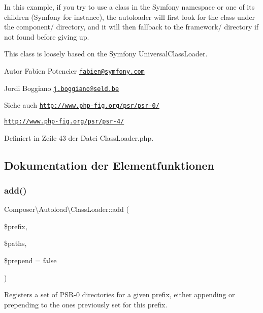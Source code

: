 In this example, if you try to use a class in the Symfony namespace or one of its children (Symfony for instance), the autoloader will first look for the class under the component/ directory, and it will then fallback to the framework/ directory if not found before giving up.

This class is loosely based on the Symfony Universal\+Class\+Loader.

\begin{DoxyAuthor}{Autor}
Fabien Potencier \href{mailto:fabien@symfony.com}{\tt fabien@symfony.\+com} 

Jordi Boggiano \href{mailto:j.boggiano@seld.be}{\tt j.\+boggiano@seld.\+be} 
\end{DoxyAuthor}
\begin{DoxySeeAlso}{Siehe auch}
\href{http://www.php-fig.org/psr/psr-0/}{\tt http\+://www.\+php-\/fig.\+org/psr/psr-\/0/} 

\href{http://www.php-fig.org/psr/psr-4/}{\tt http\+://www.\+php-\/fig.\+org/psr/psr-\/4/} 
\end{DoxySeeAlso}


Definiert in Zeile 43 der Datei Class\+Loader.\+php.



\subsection{Dokumentation der Elementfunktionen}
\mbox{\label{class_composer_1_1_autoload_1_1_class_loader_aa99f46d61bdf20b924a1bb08bfcb90bd}} 
\subsubsection{\texorpdfstring{add()}{add()}}
{\footnotesize\ttfamily Composer\textbackslash{}\+Autoload\textbackslash{}\+Class\+Loader\+::add (\begin{DoxyParamCaption}\item[{}]{\$prefix,  }\item[{}]{\$paths,  }\item[{}]{\$prepend = {\ttfamily false} }\end{DoxyParamCaption})}

Registers a set of P\+S\+R-\/0 directories for a given prefix, either appending or prepending to the ones previously set for this prefix.


